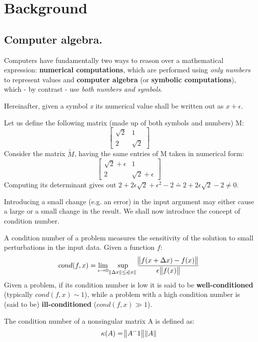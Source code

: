 \section{Background}
\subsection*{Computer algebra.}
Computers have fundamentally two ways to reason over a mathematical expression: \textbf{numerical computations}, which are performed
using \textit{only numbers} to represent values and \textbf{computer algebra} (or \textbf{symbolic computations}), which - by
contrast - use \textit{both numbers and symbols}.

Hereinafter, given a symbol \textit{x} its numerical value shall be written out as \textit{\(x + \epsilon\)}.

\begin{exmp}
    Let us define the following matrix (made up of both symbols and numbers) M:
    \[
        \begin{bmatrix}
            \sqrt{2}  &   1    \\
                2     & \sqrt{2}
        \end{bmatrix}
    \]
    Consider the matrix \( \tilde{M} \), having the same entries of M taken in numerical form:
    \[
        \begin{bmatrix}
            \sqrt{2} + \epsilon &           1         \\
                2               &  \sqrt{2} + \epsilon
        \end{bmatrix}
    \]
    Computing its determinant gives out \( 2  +2\epsilon\sqrt{2} + \epsilon^2 - 2 \doteq 2 + 2\epsilon\sqrt{2} -2 \neq 0 \).
\end{exmp}

Introducing a small change (e.g. an error) in the input argument may either cause a large or a small change in the result.
We shall now introduce the concept of condition number.

\begin{definition}
    A condition number of a problem measures the sensitivity of the solution to small perturbations in the input data.
    Given a function \(f \):
    \[
        cond(f, x) = \lim_{\epsilon \to 0} \sup \limits_{\norm{\Delta x} \leq \epsilon \norm{x}}
        \dfrac{\norm{f(x+\Delta x) - f(x)}}{\epsilon \norm{f(x)}}
    \]
    Given a problem, if its condition number is low it is said to be \textbf{well-conditioned} (typically \( cond(f, x) \sim 1 \)),
    while a problem with a high condition number is (said to be) \textbf{ill-conditioned} (\( cond(f, x) \gg 1 \)).

    The condition number of a nonsingular matrix A is defined as:
    \[
        \kappa(A) = \norm{A^-1} \norm{A}
    \]
\end{definition}

